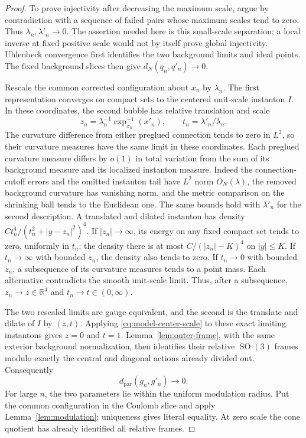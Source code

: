 \documentclass[11pt]{amsart}
\theoremstyle{definition}
\theoremstyle{remark}
\theoremstyle{plain}
\newcommand{\RR}{\mathbb{R}}
\newcommand{\SO}{\operatorname{SO}}
\begin{document}
\begin{proof}
To prove injectivity after decreasing the maximum scale, argue by
contradiction with a sequence of failed pairs whose maximum scales tend to
zero.  Thus $\lambda_n,\lambda'_n\to0$.  The assertion needed here is
this small-scale separation; a local inverse at fixed positive scale would
not by itself prove global injectivity.  Uhlenbeck convergence first identifies the two
background limits and ideal points.  The fixed background slices then give
$d_N(q_n,q'_n)\to0$.

Rescale the common corrected configuration about $x_n$ by $\lambda_n$.
The first representation converges on compact sets to the centered
unit-scale instanton $I$.  In these coordinates, the second bubble has
relative translation and scale
\begin{equation}\label{eq:relative-center-scale}
 z_n=\lambda_n^{-1}\exp_{x_n}^{-1}(x'_n),
 \qquad t_n=\lambda'_n/\lambda_n.
\end{equation}
The curvature difference from either preglued connection tends to zero
in $L^2$, so their curvature measures have the same limit in these
coordinates.  Each preglued curvature measure differs by $o(1)$ in total
variation from the sum of its background measure and its localized
instanton measure.  Indeed the connection-cutoff errors and the omitted
instanton tail have $L^2$ norm $O_N(\lambda)$, the removed background
curvature has vanishing norm, and the metric comparison on the shrinking
ball tends to the Euclidean one.  The same bounds hold with $\lambda'_n$
for the second description.  A translated and dilated instanton has density
$Ct_n^4/(t_n^2+|y-z_n|^2)^4$.  If $|z_n|\to\infty$, its energy on
any fixed compact set tends to zero, uniformly in $t_n$: the density
there is at most $C/(|z_n|-K)^4$ on $|y|\leq K$.  If $t_n\to\infty$
with bounded $z_n$, the density also tends to zero.  If $t_n\to0$
with bounded $z_n$, a subsequence of its curvature measures tends to a
point mass.  Each alternative contradicts the smooth unit-scale limit.
Thus, after a subsequence,
$z_n\to z\in\RR^4$ and $t_n\to t\in(0,\infty)$.

The two rescaled limits are gauge equivalent, and the second is the
translate and dilate of $I$ by $(z,t)$.  Applying
\eqref{eq:model-center-scale} to these exact limiting instantons gives
$z=0$ and $t=1$.  Lemma~\ref{lem:outer-frame}, with the same exterior
background normalization, then identifies their relative $\SO(3)$ frames modulo
exactly the central and diagonal actions already divided out.  Consequently
\begin{equation}\label{eq:parameter-separation}
 d_{\mathrm{par}}(g_n,g'_n)\longrightarrow0.
\end{equation}
For large $n$, the two parameters lie within the uniform modulation radius.
Put the common configuration in the Coulomb slice and apply
Lemma~\ref{lem:modulation}; uniqueness gives literal equality.  At zero
scale the cone quotient has already identified all relative frames.
\end{proof}
\end{document}
